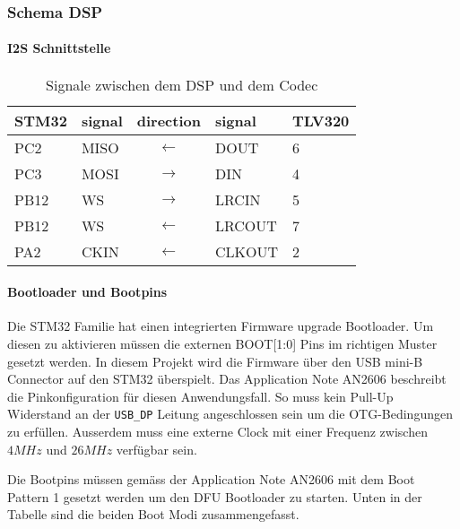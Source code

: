 \subsubsection{Schema DSP}
\label{sec:Schema_DSP}

\paragraph{I2S Schnittstelle}

\begin{table}[H]
\centering
\begin{tabular}{|l|l|c|l|l|}
\hline
\textbf{STM32} & \textbf{signal} & \textbf{direction}         & \textbf{signal} & \textbf{TLV320} \\ \hline
PC2            & MISO            & $\leftarrow$  & DOUT            & 6               \\ \hline
PC3            & MOSI            & $\rightarrow$ & DIN             & 4               \\ \hline
PB12           & WS              & $\rightarrow$ & LRCIN           & 5               \\ \hline
PB12           & WS              & $\leftarrow$  & LRCOUT          & 7               \\ \hline
PA2            & CKIN            & $\leftarrow$  & CLKOUT          & 2               \\ \hline
\end{tabular}
\caption{Signale zwischen dem DSP und dem Codec}
\end{table}


\paragraph{Bootloader und Bootpins}

Die STM32 Familie hat einen integrierten Firmware upgrade Bootloader.
Um diesen zu aktivieren müssen die externen BOOT[1:0] Pins im richtigen Muster gesetzt werden.
In diesem Projekt wird die Firmware über den USB mini-B Connector auf den STM32 überspielt.
Das Application Note AN2606 \cite[p.136]{AN2606} beschreibt die Pinkonfiguration für diesen Anwendungsfall.
So muss kein Pull-Up Widerstand an der \texttt{USB\_DP} Leitung angeschlossen sein um die OTG-Bedingungen zu erfüllen.
Ausserdem muss eine externe Clock mit einer Frequenz zwischen $4\si{MHz}$ und $26\si{MHz}$ verfügbar sein.

Die Bootpins müssen gemäss der Application Note AN2606 \cite[Table 2]{AN2606} mit dem Boot Pattern 1 gesetzt werden um den DFU Bootloader zu starten.
Unten in der Tabelle sind die beiden Boot Modi zusammengefasst.

